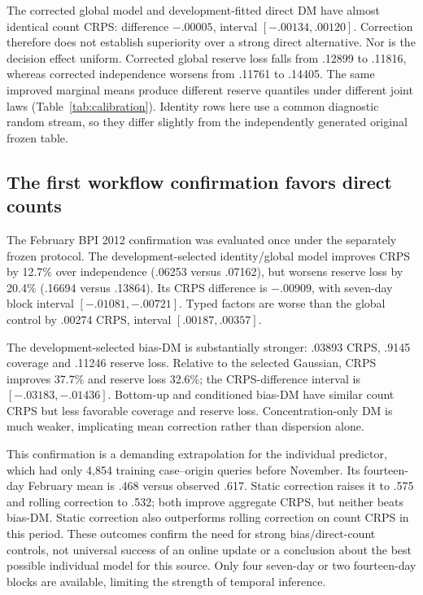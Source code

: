 The corrected global model and development-fitted direct DM have almost
identical count CRPS: difference $-.00005$, interval
$[-.00134,.00120]$. Correction therefore does not establish superiority over
a strong direct alternative. Nor is the decision effect uniform. Corrected
global reserve loss falls from .12899 to .11816, whereas corrected
independence worsens from .11761 to .14405. The same improved marginal means
produce different reserve quantiles under different joint laws
(Table~\ref{tab:calibration}). Identity rows here use a common diagnostic
random stream, so they differ slightly from the independently generated
original frozen table.

\subsection{The first workflow confirmation favors direct counts}
The February BPI 2012 confirmation was evaluated once under the separately
frozen protocol. The development-selected identity/global model improves
CRPS by 12.7\% over independence (.06253 versus .07162), but worsens
reserve loss by 20.4\% (.16694 versus .13864). Its CRPS difference is
$-.00909$, with seven-day block interval $[-.01081,-.00721]$.
Typed factors are worse than the global control by .00274 CRPS, interval
$[.00187,.00357]$.

The development-selected bias-DM is substantially stronger: .03893 CRPS,
.9145 coverage and .11246 reserve loss. Relative to the selected Gaussian,
CRPS improves 37.7\% and reserve loss 32.6\%; the CRPS-difference interval
is $[-.03183,-.01436]$. Bottom-up and conditioned bias-DM have similar
count CRPS but less favorable coverage and reserve loss. Concentration-only
DM is much weaker, implicating mean correction rather than dispersion alone.

This confirmation is a demanding extrapolation for the individual predictor,
which had only 4,854 training case--origin queries before November. Its
fourteen-day February mean is .468 versus observed .617. Static correction
raises it to .575 and rolling correction to .532; both improve aggregate
CRPS, but neither beats bias-DM. Static correction also outperforms rolling
correction on count CRPS in this period. These outcomes confirm the need for
strong bias/direct-count controls, not universal success of an online update
or a conclusion about the best possible individual model for this source.
Only four seven-day or two fourteen-day blocks are available, limiting the
strength of temporal inference.


